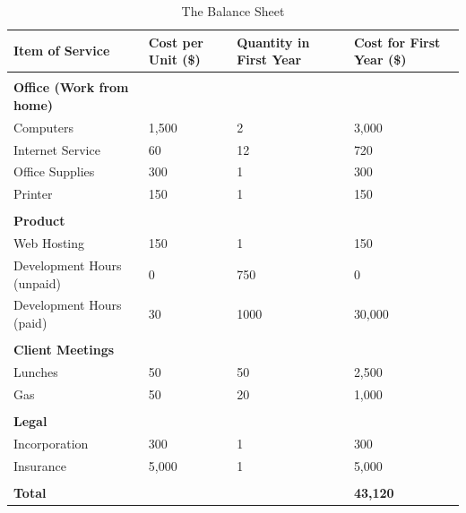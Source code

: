 \begin{table}[ht]
\caption{The Balance Sheet} %
\centering %
\begin{tabular}{| l | p{1in} | p{1in} | p{1in} |} %
\hline
{\bf Item of Service} & {\bf Cost per Unit  (\$)} &  {\bf Quantity in First Year } &  {\bf Cost for First Year (\$) } \\
\hline
 &   &   &   \\
{\bf Office (Work from home)} & & & \\
	Computers & 1,500 & 2 & 3,000 \\
	Internet Service & 60 & 12 & 720 \\
	Office Supplies & 300 & 1 & 300 \\
	Printer & 150 & 1 & 150 \\
 &   &   &   \\
{\bf Product} &   &   &   \\
	Web Hosting & 150 & 1 & 150 \\
	Development Hours (unpaid) & 0 & 750 & 0 \\
	Development Hours (paid) & 30 & 1000 & 30,000 \\
  &   &   &   \\
{\bf Client Meetings} &   &   &   \\
	Lunches & 50 &  50 & 2,500\\
	Gas & 50 & 20 & 1,000 \\
  &   &   &   \\
{\bf Legal} &   &   &   \\
	Incorporation & 300 &  1 & 300\\
	Insurance & 5,000 & 1 & 5,000 \\
 &   &  &   \\ 
{\bf Total} &   &   & {\bf 43,120} \\
\hline
\end{tabular}
\label{balanceSheet} %
\end{table}